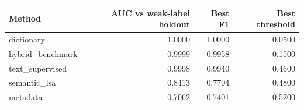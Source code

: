 \begin{tabular}{lrrr}
\toprule
Method & AUC vs weak-label holdout & Best F1 & Best threshold \\
\midrule
dictionary & 1.0000 & 1.0000 & 0.0500 \\
hybrid_benchmark & 0.9999 & 0.9958 & 0.1500 \\
text_supervised & 0.9998 & 0.9940 & 0.4600 \\
semantic_lsa & 0.8413 & 0.7704 & 0.4800 \\
metadata & 0.7062 & 0.7401 & 0.5200 \\
\bottomrule
\end{tabular}
